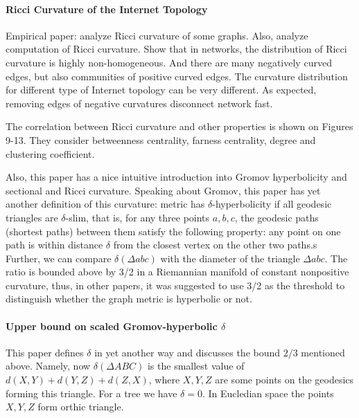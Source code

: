 \documentclass{article}
\begin{document}
\paragraph{Ricci Curvature of the Internet Topology~\cite{ni2015ricci}}

Empirical paper: analyze Ricci curvature of some graphs. Also, analyze computation of Ricci curvature. Show that in networks, the distribution of Ricci curvature is highly
non-homogeneous. And there are many negatively curved edges, but also communities of positive curved edges. The curvature distribution for different
type of Internet topology can be very different. As expected, removing edges of negative curvatures disconnect network fast.

The correlation between Ricci curvature and other properties is shown on Figures 9-13. They consider betweenness centrality, farness centrality, degree and clustering coefficient.

Also, this paper has a nice intuitive introduction into Gromov hyperbolicity and sectional and Ricci curvature. Speaking about Gromov, this paper has yet another definition of this curvature: metric has $\delta$-hyperbolicity if all geodesic triangles are $\delta$-slim, that is, for any three points
$a, b, c$, the geodesic paths (shortest paths) between them satisfy
the following property: any point on one path is within
distance $\delta$ from the closest vertex on the other two paths.s
Further, we can compare $\delta(\Delta abc)$ with
the diameter of the triangle $\Delta abc$. The ratio is bounded above
by 3/2 in a Riemannian manifold of constant nonpositive
curvature, thus, in other papers, it was suggested to use 3/2 as the threshold to
distinguish whether the graph metric is hyperbolic or not.

\paragraph{Upper bound on scaled Gromov-hyperbolic $\delta$~\cite{jonckheere2007upper}}

This paper defines $\delta$ in yet another way and discusses the bound $2/3$ mentioned above. Namely, now $\delta(\Delta ABC)$ is the smallest value of $d(X,Y) + d(Y,Z) + d(Z, X)$, where $X, Y, Z$ are some points on the geodesics forming this triangle. For a tree we have $\delta = 0$. In Eucledian space the points $X, Y, Z$ form orthic triangle.

\end{document}
